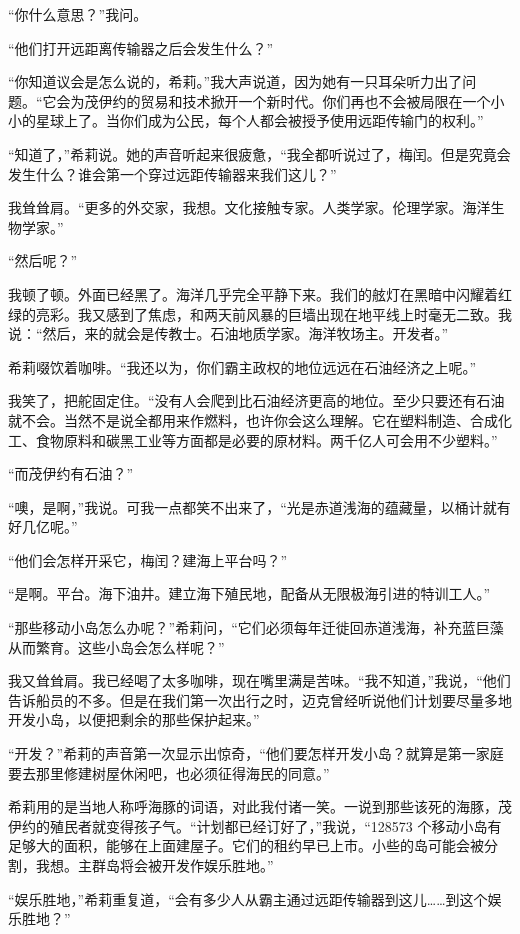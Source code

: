 \documentclass[AutoFakeBold=true]{book}
\begin{document}
``你什么意思？''我问。

``他们打开远距离传输器之后会发生什么？''

``你知道议会是怎么说的，希莉。''我大声说道，因为她有一只耳朵听力出了问题。``它会为茂伊约的贸易和技术掀开一个新时代。你们再也不会被局限在一个小小的星球上了。当你们成为公民，每个人都会被授予使用远距传输门的权利。''

``知道了，''希莉说。她的声音听起来很疲惫，``我全都听说过了，梅闰。但是究竟会发生什么？谁会第一个穿过远距传输器来我们这儿？''

我耸耸肩。``更多的外交家，我想。文化接触专家。人类学家。伦理学家。海洋生物学家。''

``然后呢？''

我顿了顿。外面已经黑了。海洋几乎完全平静下来。我们的舷灯在黑暗中闪耀着红绿的亮彩。我又感到了焦虑，和两天前风暴的巨墙出现在地平线上时毫无二致。我说：``然后，来的就会是传教士。石油地质学家。海洋牧场主。开发者。''

希莉啜饮着咖啡。``我还以为，你们霸主政权的地位远远在石油经济之上呢。''

我笑了，把舵固定住。``没有人会爬到比石油经济更高的地位。至少只要还有石油就不会。当然不是说全都用来作燃料，也许你会这么理解。它在塑料制造、合成化工、食物原料和碳黑工业等方面都是必要的原材料。两千亿人可会用不少塑料。''

``而茂伊约有石油？''

``噢，是啊，''我说。可我一点都笑不出来了，``光是赤道浅海的蕴藏量，以桶计就有好几亿呢。''

``他们会怎样开采它，梅闰？建海上平台吗？''

``是啊。平台。海下油井。建立海下殖民地，配备从无限极海引进的特训工人。''

``那些移动小岛怎么办呢？''希莉问，``它们必须每年迁徙回赤道浅海，补充蓝巨藻从而繁育。这些小岛会怎么样呢？''

我又耸耸肩。我已经喝了太多咖啡，现在嘴里满是苦味。``我不知道，''我说，``他们告诉船员的不多。但是在我们第一次出行之时，迈克曾经听说他们计划要尽量多地开发小岛，以便把剩余的那些保护起来。''

``开发？''希莉的声音第一次显示出惊奇，``他们要怎样开发小岛？就算是第一家庭要去那里修建树屋休闲吧，也必须征得海民的同意。''

希莉用的是当地人称呼海豚的词语，对此我付诸一笑。一说到那些该死的海豚，茂伊约的殖民者就变得孩子气。``计划都已经订好了，''我说，``128573 个移动小岛有足够大的面积，能够在上面建屋子。它们的租约早已上市。小些的岛可能会被分割，我想。主群岛将会被开发作娱乐胜地。''

``娱乐胜地，''希莉重复道，``会有多少人从霸主通过远距传输器到这儿……到这个娱乐胜地？''
\end{document}

